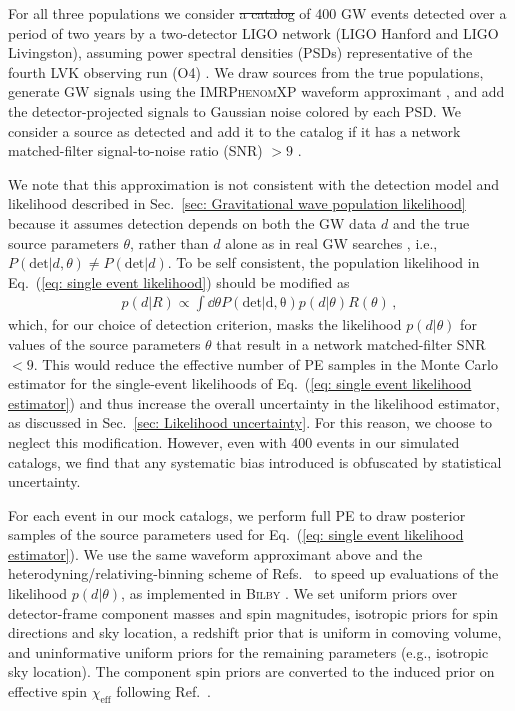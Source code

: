 \documentclass[%
reprint,
 amsmath,amssymb,
 aps,
 prd,nofootinbib,nobibnotes,
 superscriptaddress,groupedaddress,
]{revtex4-2}
\providecommand{\DIFaddtex}[1]{{\protect\color{blue}\uwave{#1}}} %
\providecommand{\DIFdeltex}[1]{{\protect\color{red}\sout{#1}}}                      %
\providecommand{\DIFaddbegin}{} %
\providecommand{\DIFaddend}{} %
\providecommand{\DIFdelbegin}{} %
\providecommand{\DIFdelend}{} %
\providecommand{\DIFadd}[1]{\texorpdfstring{\DIFaddtex{#1}}{#1}} %
\providecommand{\DIFdel}[1]{\texorpdfstring{\DIFdeltex{#1}}{}} %
\newcommand{\DIFscaledelfig}{0.5}
\newlength{\DIFdelgraphicswidth} %
\newlength{\DIFdelgraphicsheight} %
\newcommand{\DIFaddincludegraphics}[2][]{{\color{blue}\fbox{\DIFOincludegraphics[#1]{#2}}}} %
\newcommand{\DIFdelincludegraphics}[2][]{%
\sbox{\DIFdelgraphicsbox}{\DIFOincludegraphics[#1]{#2}}%
\settoboxwidth{\DIFdelgraphicswidth}{\DIFdelgraphicsbox} %
\settoboxtotalheight{\DIFdelgraphicsheight}{\DIFdelgraphicsbox} %
\scalebox{\DIFscaledelfig}{%
\parbox[b]{\DIFdelgraphicswidth}{\usebox{\DIFdelgraphicsbox}\\[-\baselineskip] \rule{\DIFdelgraphicswidth}{0em}}\llap{\resizebox{\DIFdelgraphicswidth}{\DIFdelgraphicsheight}{%
\setlength{\unitlength}{\DIFdelgraphicswidth}%
\begin{picture}(1,1)%
\thicklines\linethickness{2pt} %
{\color[rgb]{1,0,0}\put(0,0){\framebox(1,1){}}}%
{\color[rgb]{1,0,0}\put(0,0){\line( 1,1){1}}}%
{\color[rgb]{1,0,0}\put(0,1){\line(1,-1){1}}}%
\end{picture}%
}\hspace*{3pt}}} %
} %
\DeclareRobustCommand{\DIFaddbegin}{\DIFOaddbegin \let\includegraphics\DIFaddincludegraphics} %
\DeclareRobustCommand{\DIFaddend}{\DIFOaddend \let\includegraphics\DIFOincludegraphics} %
\DeclareRobustCommand{\DIFdelbegin}{\DIFOdelbegin \let\includegraphics\DIFdelincludegraphics} %
\DeclareRobustCommand{\DIFdelend}{\DIFOaddend \let\includegraphics\DIFOincludegraphics} %
\begin{document}
For all three populations we consider \DIFdelbegin \DIFdel{a catalog }\DIFdelend \DIFaddbegin \DIFadd{catalogs }\DIFaddend of 400 GW events detected over a period of two years by a two-detector LIGO network (LIGO Hanford and LIGO Livingston), assuming power spectral densities (PSDs) representative of the fourth LVK observing run (O4) \cite{KAGRA:2013rdx}. We draw sources from the true populations, generate GW signals using the \textsc{IMRPhenomXP} waveform approximant \cite{Pratten:2020ceb}, and add the detector-projected signals to Gaussian noise colored by each PSD. We consider a source as detected and add it to the catalog if it has a network matched-filter signal-to-noise ratio (SNR) $>9$ \cite{Essick:2023toz, Mould:2023eca}.

We note that this approximation is not consistent with the detection model and likelihood described in Sec.~\ref{sec: Gravitational wave population likelihood} because it assumes detection depends on both the GW data $d$ and the true source parameters $\theta$, rather than $d$ alone as in real GW searches \cite{Essick:2023upv}, i.e., $P(\mathrm{det}|d,\theta) \neq P(\mathrm{det}|d)$. To be self consistent, the population likelihood in Eq.~(\ref{eq: single event likelihood}) should be modified as
\begin{align}
p(d|R)
\propto
\int \dd{\theta}
P(\mathrm{det|d,\theta}) p(d|\theta) R(\theta)
\, ,
\end{align}
which, for our choice of detection criterion, masks the likelihood $p(d|\theta)$ for values of the source parameters $\theta$ that result in a network matched-filter SNR $<9$. This would reduce the effective number of PE samples in the Monte Carlo estimator for the single-event likelihoods of Eq.~(\ref{eq: single event likelihood estimator}) and thus increase the overall uncertainty in the likelihood estimator, as discussed in Sec.~\ref{sec: Likelihood uncertainty}. For this reason, we choose to neglect this modification. However, even with 400 events in our simulated catalogs, we find that any systematic bias introduced is obfuscated by statistical uncertainty.

For each event in our mock catalogs, we perform full PE to draw posterior samples of the source parameters used for Eq.~(\ref{eq: single event likelihood estimator}). We use the same waveform approximant above and the heterodyning/relativing-binning scheme of Refs.~\cite{Cornish:2010kf, Cornish:2021lje, Zackay:2018qdy} to speed up evaluations of the likelihood $p(d|\theta)$, as implemented in \textsc{Bilby} \cite{Ashton:2018jfp, Krishna:2023bug}. We set uniform priors over detector-frame component masses and spin magnitudes, isotropic priors for spin directions and sky location, a redshift prior that is uniform in comoving volume, and uninformative uniform priors for the remaining parameters (e.g., isotropic sky location). The component spin priors are converted to the induced prior on effective spin $\chi_\mathrm{eff}$ following Ref.~\cite{Callister:2021gxf}.
\end{document}
